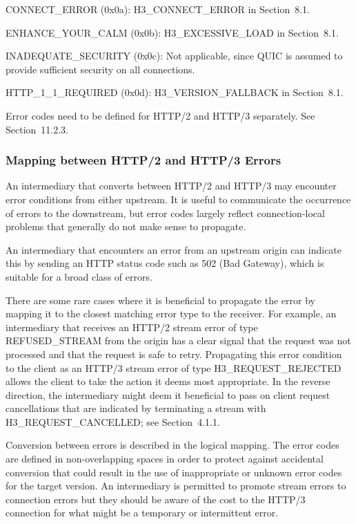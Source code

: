 \documentclass{article}
\begin{document}
CONNECT\_ERROR (0x0a):  H3\_CONNECT\_ERROR in Section~8.1.

ENHANCE\_YOUR\_CALM (0x0b):  H3\_EXCESSIVE\_LOAD in Section~8.1.

INADEQUATE\_SECURITY (0x0c):  Not applicable, since QUIC is assumed to provide sufficient security on all connections.

HTTP\_1\_1\_REQUIRED (0x0d):  H3\_VERSION\_FALLBACK in Section~8.1.

Error codes need to be defined for HTTP/2 and HTTP/3 separately.  See Section~11.2.3.

\subsubsection{Mapping between HTTP/2 and HTTP/3 Errors}

An intermediary that converts between HTTP/2 and HTTP/3 may encounter error conditions from either upstream.  It is useful to communicate the occurrence of errors to the downstream, but error codes largely reflect connection-local problems that generally do not make sense to propagate.

An intermediary that encounters an error from an upstream origin can indicate this by sending an HTTP status code such as 502 (Bad Gateway), which is suitable for a broad class of errors.

There are some rare cases where it is beneficial to propagate the error by mapping it to the closest matching error type to the receiver.  For example, an intermediary that receives an HTTP/2 stream error of type REFUSED\_STREAM from the origin has a clear signal that the request was not processed and that the request is safe to retry.  Propagating this error condition to the client as an HTTP/3 stream error of type H3\_REQUEST\_REJECTED allows the client to take the action it deems most appropriate.  In the reverse direction, the intermediary might deem it beneficial to pass on client request cancellations that are indicated by terminating a stream with H3\_REQUEST\_CANCELLED; see Section~4.1.1.

Conversion between errors is described in the logical mapping.  The error codes are defined in non-overlapping spaces in order to protect against accidental conversion that could result in the use of inappropriate or unknown error codes for the target version.  An intermediary is permitted to promote stream errors to connection errors but they should be aware of the cost to the HTTP/3 connection for what might be a temporary or intermittent error.
\end{document}
